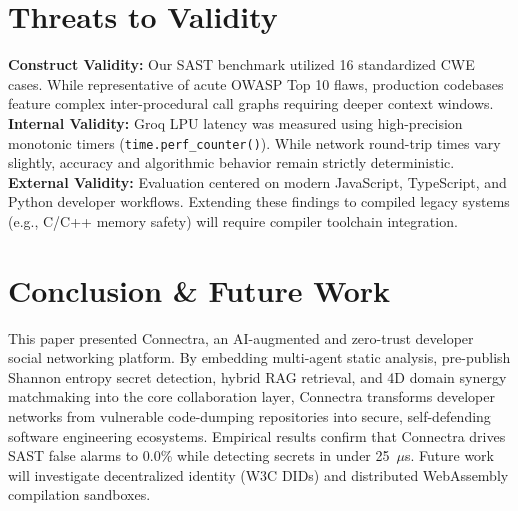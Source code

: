 \documentclass[journal,10pt,twocolumn]{IEEEtran}
\begin{document}
\section{Threats to Validity}
\textbf{Construct Validity:} Our SAST benchmark utilized 16 standardized CWE cases. While representative of acute OWASP Top 10 flaws, production codebases feature complex inter-procedural call graphs requiring deeper context windows.  
\textbf{Internal Validity:} Groq LPU latency was measured using high-precision monotonic timers (\texttt{time.perf\_counter()}). While network round-trip times vary slightly, accuracy and algorithmic behavior remain strictly deterministic.  
\textbf{External Validity:} Evaluation centered on modern JavaScript, TypeScript, and Python developer workflows. Extending these findings to compiled legacy systems (e.g., C/C++ memory safety) will require compiler toolchain integration.

\section{Conclusion \& Future Work}
This paper presented Connectra, an AI-augmented and zero-trust developer social networking platform. By embedding multi-agent static analysis, pre-publish Shannon entropy secret detection, hybrid RAG retrieval, and 4D domain synergy matchmaking into the core collaboration layer, Connectra transforms developer networks from vulnerable code-dumping repositories into secure, self-defending software engineering ecosystems. Empirical results confirm that Connectra drives SAST false alarms to 0.0\% while detecting secrets in under 25~$\mu$s. Future work will investigate decentralized identity (W3C DIDs) and distributed WebAssembly compilation sandboxes.



\end{document}
